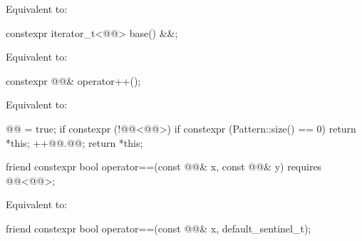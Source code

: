 \begin{itemdescr}
\pnum
\effects
Equivalent to: 
\end{itemdescr}

%
\begin{itemdecl}
constexpr iterator_t<@@> base() &&;
\end{itemdecl}

\begin{itemdescr}
\pnum
\effects
Equivalent to: 
\end{itemdescr}

%
\begin{itemdecl}
constexpr @@& operator++();
\end{itemdecl}

\begin{itemdescr}
\pnum
\effects
Equivalent to:
\begin{codeblock}
@@ = true;
if constexpr (!@@<@@>) {
  if constexpr (Pattern::size() == 0) {
    return *this;
  }
}
++@@.@@;
return *this;
\end{codeblock}
\end{itemdescr}

%
\begin{itemdecl}
friend constexpr bool operator==(const @@& x, const @@& y)
  requires @@<@@>;
\end{itemdecl}

\begin{itemdescr}
\pnum
\effects
Equivalent to: 
\end{itemdescr}

%
\begin{itemdecl}
friend constexpr bool operator==(const @@& x, default_sentinel_t);
\end{itemdecl}

